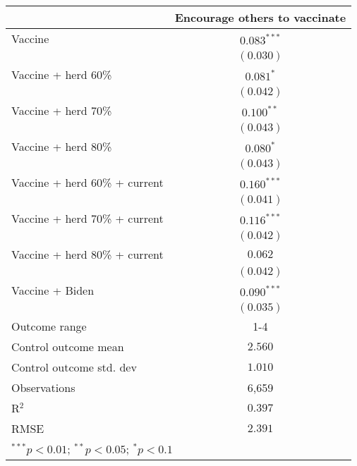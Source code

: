 \begin{table}
\begin{center}
\begin{tabular}{l c}
\hline
 & Encourage others to vaccinate \\
\hline
Vaccine                       & $0.083^{***}$ \\
                              & $(0.030)$     \\
Vaccine + herd 60\%           & $0.081^{*}$   \\
                              & $(0.042)$     \\
Vaccine + herd 70\%           & $0.100^{**}$  \\
                              & $(0.043)$     \\
Vaccine + herd 80\%           & $0.080^{*}$   \\
                              & $(0.043)$     \\
Vaccine + herd 60\% + current & $0.160^{***}$ \\
                              & $(0.041)$     \\
Vaccine + herd 70\% + current & $0.116^{***}$ \\
                              & $(0.042)$     \\
Vaccine + herd 80\% + current & $0.062$       \\
                              & $(0.042)$     \\
Vaccine + Biden               & $0.090^{***}$ \\
                              & $(0.035)$     \\
\hline
Outcome range                 & 1-4           \\
Control outcome mean          & $2.560$       \\
Control outcome std. dev      & $1.010$       \\
Observations                  & 6,659         \\
R$^{2}$                       & $0.397$       \\
RMSE                          & $2.391$       \\
\hline
\multicolumn{2}{l}{\scriptsize{$^{***}p<0.01$; $^{**}p<0.05$; $^{*}p<0.1$}}
\end{tabular}
\caption{}
\label{table:SI_table24_allinfo_pooled_encourage1-4}
\end{center}
\end{table}
